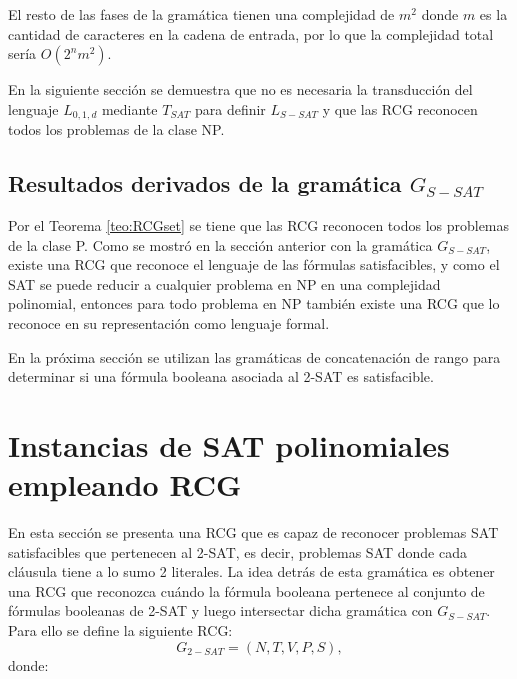 \documentclass{article}
\begin{document}
El resto de las fases de la gramática tienen una complejidad de $m^2$ donde $m$
es la cantidad de caracteres en la cadena de entrada, por lo que la complejidad total sería $O(2^nm^2)$.

En la siguiente sección se demuestra que no es necesaria la transducción del lenguaje $L_{0,1,d}$ mediante $T_{SAT}$
para definir $L_{S-SAT}$ y que las RCG reconocen todos los problemas de la clase NP.
\subsection{Resultados derivados de la gramática $G_{S-SAT}$}

Por el Teorema \ref{teo:RCGset} se tiene que las RCG reconocen todos los problemas de la clase P. Como se mostró en la sección anterior con la gramática $G_{S-SAT}$, existe una RCG que reconoce el lenguaje de las fórmulas satisfacibles, y como el SAT se puede reducir a cualquier problema en NP en una complejidad polinomial, entonces para todo problema en NP también existe una RCG que lo reconoce en su representación como lenguaje formal.

En la próxima sección se utilizan las gramáticas de concatenación de rango para determinar si una fórmula booleana asociada al 2-SAT es satisfacible.

\section{Instancias de SAT polinomiales empleando RCG}
\label{sec:pSATRCG}

En esta sección se presenta una RCG que es capaz de reconocer problemas SAT satisfacibles que pertenecen al 2-SAT, es decir, problemas SAT donde cada cláusula tiene a lo sumo 2 literales. La idea detrás de esta gramática es obtener una RCG que reconozca cuándo la fórmula booleana pertenece al conjunto de fórmulas booleanas de 2-SAT y luego intersectar dicha gramática con $G_{S-SAT}$.  Para ello se define la siguiente RCG:
\[
    G_{2-SAT} = (N, T, V, P, S),
\]
donde:
\end{document}
